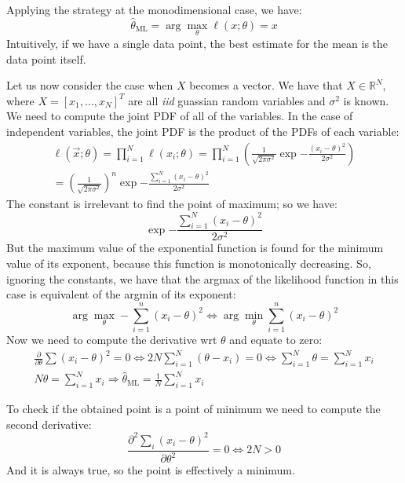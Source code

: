 Applying the strategy at the monodimensional case, we have:
\[
    \hat{\theta}_{\text{ML}} = \arg\max_{\theta} \ell(x; \theta) = x
\]
Intuitively, if we have a single data point, the best estimate for the mean is the data point itself.

Let us now consider the case when $X$ becomes a vector. We have that $X \in \mathbb{R}^N$, where
$X = \left[x_1, \dots, x_N\right]^T$ are all \textit{iid} guassian random variables and $\sigma^2$ is known. We need to compute the joint PDF of all of the variables. In the case of independent variables, the joint PDF is the product of the PDFs of each variable:
\begin{align*}
    \ell(\vec{x};\theta) = \prod_{i=1}^{N} \ell(x_i;\theta) = \prod_{i=1}^{N} \left(\frac{1}{\sqrt{2\pi\sigma^2}} \exp{-\frac{(x_i - \theta)^2}{2\sigma^2}}\right) \\
    = \left(\frac{1}{\sqrt{2\pi\sigma^2}}\right)^n \exp{-\frac{\sum_{i=1}^{N} (x_i - \theta)^2}{2\sigma^2}}
\end{align*}
The constant is irrelevant to find the point of maximum; so we have:
\[
    \exp{-\frac{\sum_{i=1}^{N} (x_i - \theta)^2}{2\sigma^2}}
\]
But the maximum value of the exponential function is found for the minimum value of its exponent, because this function is monotonically decreasing. So, ignoring the constants, we have that the argmax of the likelihood function in this case is equivalent of the argmin of its exponent:
\[
    \arg\max_{\theta} - \sum_{i = 1}^{n} {(x_i - \theta)^2} \Leftrightarrow \arg\min_{\theta} \sum_{i = 1}^{n} {(x_i - \theta)^2}
\]
Now we need to compute the derivative wrt $\theta$ and equate to zero:
\begin{gather*}
    \frac{\partial }{\partial \theta}\sum(x_i-\theta)^2 = 0 \Leftrightarrow 2N\sum_{i=1}^N(\theta - x_i) = 0 \Leftrightarrow \sum_{i=1}^N \theta = \sum_{i=1}^N x_i \\
    N\theta = \sum_{i=1}^N x_i \Rightarrow \hat{\theta}_{\text{ML}}  = \frac{1}{N}\sum_{i=1}^N x_i
\end{gather*}

To check if the obtained point is a point of minimum we need to compute the second derivative:
\[
    \frac{\partial^2 \sum_i(x_i-\theta)^2}{\partial \theta^2} = 0 \Leftrightarrow 2N > 0
\]
And it is always true, so the point is effectively a minimum.

